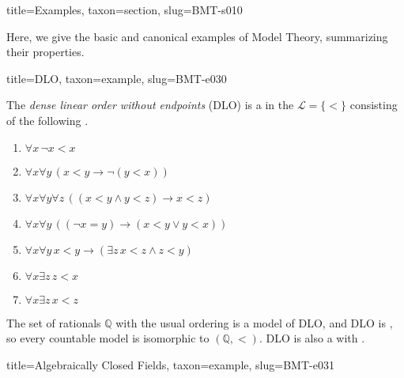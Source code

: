 \documentclass[a4paper]{article}
\begin{document}
  
  
\begin{tree}{title={Examples}, taxon={section}, slug={BMT-s010}}

    Here, we give the basic and canonical examples of Model Theory, summarizing their properties.

\begin{tree}{title={DLO}, taxon={example}, slug={BMT-e030}}

    The \emph{dense linear order without endpoints} (DLO) is a  in the  \(\mathcal  L= \{ < \}\)
    consisting of the following .
    \begin{enumerate}
\item{\(\forall  x \, \neg  x<x\)}
        \item{\(\forall  x \forall  y \, (x<y \rightarrow \neg (y<x))\)}
        \item{\(\forall  x \forall  y \forall  z \, ((x<y \land  y<z) \rightarrow  x<z)\)}
        \item{\(\forall  x \forall  y \, (( \neg  x=y) \rightarrow (x<y \lor  y<x))\)}
        \item{\(\forall  x \forall  y \, x<y \rightarrow ( \exists  z \, x<z \land  z<y)\)}
        \item{\(\forall  x \exists  z \, z<x\)}
        \item{\(\forall  x \exists  z \, x<z\)}
\end{enumerate}\par{
    The set of rationals \(\mathbb  Q\) with the usual ordering is a model of DLO, and DLO is ,
    so every countable model is isomorphic to \(( \mathbb  Q,<)\). DLO is also a  with
    .
}
\end{tree}

\begin{tree}{title={Algebraically Closed Fields}, taxon={example}, slug={BMT-e031}}


\end{tree}
\end{tree}
\end{document}
